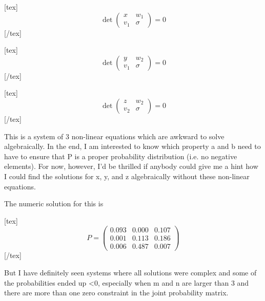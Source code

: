 [tex]\begin{equation}
  \label{eq:r4}
  \det\left(
    \begin{array}{ll}
      x & w_{1} \\
      v_{1} & \sigma
    \end{array}
\right)=0
\end{equation}[/tex]

[tex]\begin{equation}
  \label{eq:r5}
  \det\left(
    \begin{array}{ll}
      y & w_{2} \\
      v_{1} & \sigma
    \end{array}
\right)=0
\end{equation}[/tex]

[tex]\begin{equation}
  \label{eq:r6}
  \det\left(
    \begin{array}{ll}
      z & w_{2} \\
      v_{2} & \sigma
    \end{array}
\right)=0
\end{equation}[/tex]

This is a system of 3 non-linear equations which are awkward to solve
algebraically. In the end, I am interested to know which property a
and b need to have to ensure that P is a proper probability
distribution (i.e. no negative elements). For now, however, I'd be
thrilled if anybody could give me a hint how I could find the
solutions for x, y, and z algebraically without these non-linear
equations.

The numeric solution for this is

[tex]\begin{equation}
  \label{eq:r1}
P=\left(
  \begin{array}{rrr}
    0.093 & 0.000 & 0.107 \\
    0.001 & 0.113 & 0.186 \\
    0.006 & 0.487 & 0.007
  \end{array}
\right)
\end{equation}[/tex]

But I have definitely seen systems where all solutions were complex
and some of the probabilities ended up <0, especially when m and n are
larger than 3 and there are more than one zero constraint in the joint
probability matrix.